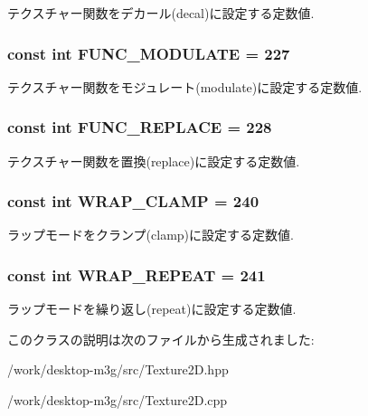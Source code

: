 テクスチャー関数をデカール(decal)に設定する定数値. \hypertarget{classm3g_1_1Texture2D_4482b0d4d6d1f64aaf33c3c5862de30e}{
\subsubsection[{FUNC\_\-MODULATE}]{\setlength{\rightskip}{0pt plus 5cm}const int {\bf FUNC\_\-MODULATE} = 227}}
\label{classm3g_1_1Texture2D_4482b0d4d6d1f64aaf33c3c5862de30e}


テクスチャー関数をモジュレート(modulate)に設定する定数値. \hypertarget{classm3g_1_1Texture2D_14f24332e168c5e210ddad47fb5cdd17}{
\subsubsection[{FUNC\_\-REPLACE}]{\setlength{\rightskip}{0pt plus 5cm}const int {\bf FUNC\_\-REPLACE} = 228}}
\label{classm3g_1_1Texture2D_14f24332e168c5e210ddad47fb5cdd17}


テクスチャー関数を置換(replace)に設定する定数値. \hypertarget{classm3g_1_1Texture2D_e36d8facf5b60eb6c59888121731c438}{
\subsubsection[{WRAP\_\-CLAMP}]{\setlength{\rightskip}{0pt plus 5cm}const int {\bf WRAP\_\-CLAMP} = 240}}
\label{classm3g_1_1Texture2D_e36d8facf5b60eb6c59888121731c438}


ラップモードをクランプ(clamp)に設定する定数値. \hypertarget{classm3g_1_1Texture2D_b37ff061b9fb272284c4c389deec9266}{
\subsubsection[{WRAP\_\-REPEAT}]{\setlength{\rightskip}{0pt plus 5cm}const int {\bf WRAP\_\-REPEAT} = 241}}
\label{classm3g_1_1Texture2D_b37ff061b9fb272284c4c389deec9266}


ラップモードを繰り返し(repeat)に設定する定数値. 

このクラスの説明は次のファイルから生成されました:\begin{CompactItemize}
\item 
/work/desktop-m3g/src/Texture2D.hpp\item 
/work/desktop-m3g/src/Texture2D.cpp\end{CompactItemize}
